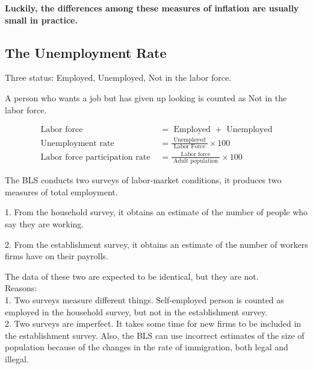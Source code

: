 \documentclass[12pt]{article}
\begin{document}
{\textbf {Luckily, the differences among these measures of inflation are usually
small in practice.}}

\begin{figure}[H]
\end{figure}








\subsection{The Unemployment Rate}
Three status:
Employed, Unemployed, Not in the labor force.

A person who wants a job but has given up looking is counted as Not in the labor force.


\begin{align*}
\text{ Labor force } &= \text{ Employed }  + \text{ Unemployed }\\
\text{ Unemployment rate } &= \frac{\text{ Unemployed }}{\text{ Labor Force }} \times 
100\\
\text{ Labor force participation rate } &= 
\frac{\text{ Labor force }}{\text{ Adult population }} \times 100
\end{align*}


The BLS conducts two surveys of labor-market conditions, it produces two measures of 
total employment. 

1. From the household survey, it obtains an estimate of the number of people who say they
are working. 

2. From the establishment survey, it obtains an estimate of the number of workers firms 
have on their payrolls.


The data of these two are expected to be identical, but they are not.\\
Reasons:\\
1. Two surveys measure different things. Self-employed person is counted as employed in 
the household survey, but not in the establishment survey.\\
2. Two surveys are imperfect. It takes some time for new firms to be included in the
establishment survey. Also, the BLS can use incorrect estimates of the size of population
because of the changes in the rate of immigration, both legal and illegal.
\end{document}
